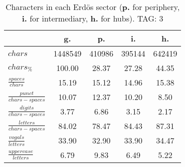 \begin{table}[h!]
\begin{center}
\begin{tabular}{| l | c | c | c | c |}\hline
 & g. & p. & i. & h. \\\hline
$chars$ & 1448549  & 410986  & 395144  & 642419 \\\hline
$chars_{\%}$ & 100.00  & 28.37  & 27.28  & 44.35 \\\hline
$\frac{spaces}{chars}$ & 15.19  & 15.12  & 14.96  & 15.38 \\\hline
$\frac{punct}{chars-spaces}$ & 10.07  & 12.37  & 10.20  & 8.50 \\\hline
$\frac{digits}{chars-spaces}$ & 3.77  & 6.86  & 3.15  & 2.17 \\\hline
$\frac{letters}{chars-spaces}$ & 84.02  & 78.47  & 84.43  & 87.31 \\\hline
$\frac{vogals}{letters}$ & 33.90  & 32.90  & 33.90  & 34.47 \\\hline
$\frac{uppercase}{letters}$ & 6.79  & 9.83  & 6.49  & 5.22 \\\hline
\end{tabular}
\caption{Characters in each Erd\"os sector ({{\bf p.}} for periphery, {{\bf i.}} for intermediary, 
    {{\bf h.}} for hubs). TAG: 3}
\end{center}
\end{table}